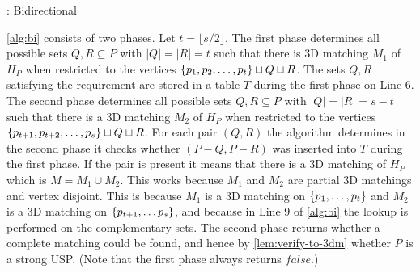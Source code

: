 \documentclass[11pt]{article}
\newcommand\sse{\subseteq}
\begin{document}
\begin{algorithm}[h]
  \caption{: Bidirectional}
  \label{alg:bi}
\begin{algorithmic}[1]
     
    \Else {}
        \Else {} \EndIf
    \EndIf
  \EndIf
   
      \EndIf
    \EndFor
  \EndFor
  \EndFunction

  \EndFunction
\end{algorithmic}
\end{algorithm}

\autoref{alg:bi} consists of two phases. Let $t = \lfloor s/2
\rfloor$. The first phase determines all possible sets $Q,R \sse P$
with $|Q| = |R| = t$ such that there is 3D matching $M_1$ of $H_P$
when restricted to the vertices $\left\{ p_1,p_2, \ldots, p_t \right\} \sqcup Q
\sqcup R$.  The sets $Q,R$ satisfying the requirement are stored in a
table $T$ during the first phase on Line 6.  The second phase
determines all possible sets $Q,R \sse P$ with $|Q| = |R| = s - t$
such that there is a 3D matching $M_2$ of $H_P$ when restricted to the
vertices $\left\{ p_{t+1},p_{t+2},\ldots,p_s \right\} \sqcup Q \sqcup R$.  For
each pair $(Q,R)$ the algorithm determines in the second phase it
checks whether $(P - Q, P - R)$ was inserted into $T$ during the first
phase.  If the pair is present it means that there is a 3D matching of
$H_P$ which is $M = M_1 \cup M_2$.  This works because $M_1$ and $M_2$
are partial 3D matchings and vertex disjoint.  This is because $M_1$
is a 3D matching on $\left\{ p_1,\ldots,p_t \right\}$ and $M_2$ is a 3D matching
on $\left\{ p_{t+1},\ldots p_s \right\}$, and because in Line 9 of
\autoref{alg:bi} the lookup is performed on the complementary sets.
The second phase returns whether a complete matching could be found,
and hence by \autoref{lem:verify-to-3dm} whether $P$ is a strong USP.
(Note that the first phase always returns $false$.)
\end{document}
